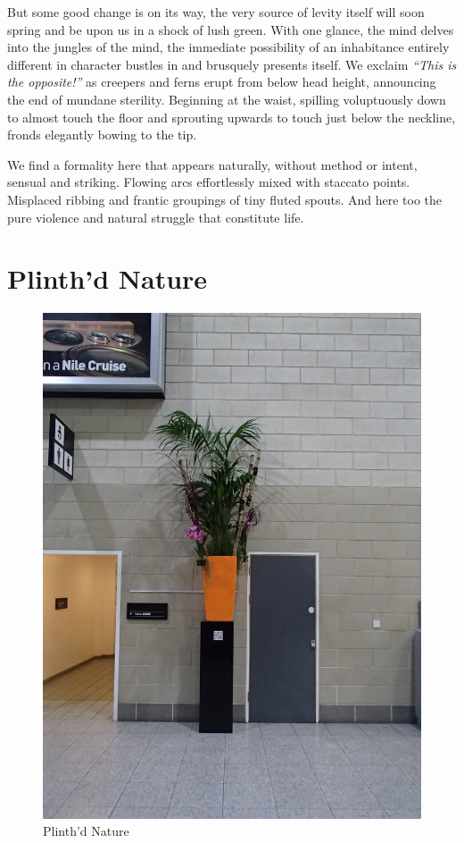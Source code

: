 \documentclass{book}
\begin{document}
But some good change is on its way, the very source of levity itself will soon
spring and be upon us in a shock of lush green. With one glance, the mind
delves into the jungles of the mind, the immediate possibility of an
inhabitance entirely different in character bustles in and brusquely presents
itself. We exclaim \emph{``This is the opposite!''} as creepers and ferns erupt
from below head height, announcing the end of mundane sterility. Beginning at
the waist, spilling voluptuously down to almost touch the floor and sprouting
upwards to touch just below the neckline, fronds elegantly bowing to the tip.

We find a formality here that appears naturally, without method or intent,
sensual and striking. Flowing arcs effortlessly mixed with staccato points.
Misplaced ribbing and frantic groupings of tiny fluted spouts. And here too
the pure violence and natural struggle that constitute life.

\chapter{Plinth'd Nature}

\begin{figure}
\centering
\includegraphics[width=\textwidth,angle=90]{figures/P1050143.JPG}
\caption{Plinth'd Nature}
\end{figure}
\end{document}
